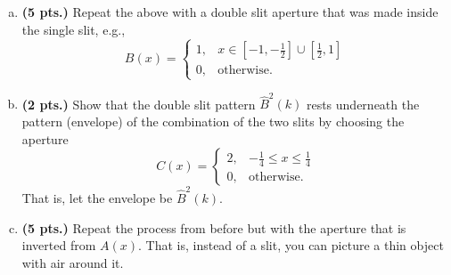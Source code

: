 \documentclass[12pt]{article} %
\begin{document}
\begin{problem}
\begin{enumerate}[(a)]
    \item \textbf{(5 pts.)} Repeat the above with a double slit aperture that was made inside the single slit, e.g.,
    \[
    B(x) = \begin{cases} 1, & x\in \left[-1,-\frac{1}{2}\right] \cup \left[\frac{1}{2},1\right] \\
    0, &\textrm{otherwise}.
    \end{cases}
    \]
	\item \textbf{(2 pts.)} Show that the double slit pattern $\hat{B}^2(k)$ rests underneath the pattern (envelope) of the combination of the two slits by choosing the aperture
	\[
	C(x) = \begin{cases} 2, & -\frac{1}{4} \leq x \leq \frac{1}{4}\\
    0, &\textrm{otherwise}.
    \end{cases}
	\]
	That is, let the envelope be $\hat{B}^2(k)$.
	\item \textbf{(5 pts.)} Repeat the process from before but with the aperture that is inverted from $A(x)$. That is, instead of a slit, you can picture a thin object with air around it.
\end{enumerate}
\end{problem}
 
\end{document}
